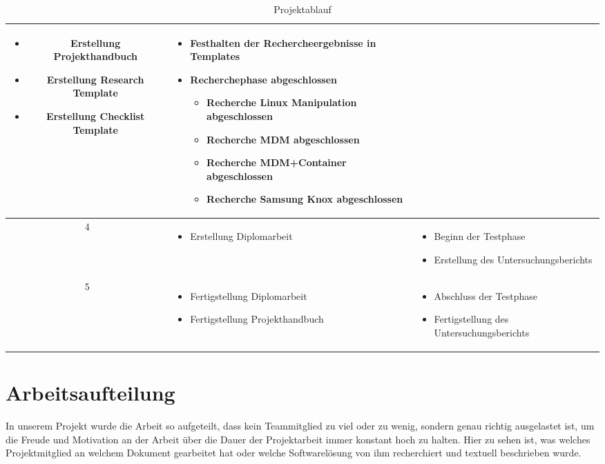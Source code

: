 \begin{table}
\begin{tabular}{| c | p{6.5cm} | p{7.5cm} |}
\begin{itemize}
			\item Erstellung Projekthandbuch
			\item Erstellung Research Template
			\item Erstellung Checklist Template
		\end{itemize}
		&%
		\begin{itemize}
			\item Festhalten der Rechercheergebnisse in Templates
			\item Recherchephase abgeschlossen
			\begin{itemize}
				\item Recherche Linux Manipulation abgeschlossen
				\item Recherche MDM abgeschlossen
				\item Recherche MDM+Container abgeschlossen
				\item Recherche Samsung Knox abgeschlossen
			\end{itemize}
		\end{itemize}
		\\\hline %
		4
		&%
		\begin{itemize}
			\item Erstellung Diplomarbeit
		\end{itemize}
		&%
		\begin{itemize}
			\item Beginn der Testphase
			\item Erstellung des Untersuchungsberichts
		\end{itemize}
		\\\hline %
		5
		&%
		\begin{itemize}
			\item Fertigstellung Diplomarbeit
			\item Fertigstellung Projekthandbuch
		\end{itemize}
		&%
		\begin{itemize}
			\item Abschluss der Testphase
			\item Fertigstellung des Untersuchungsberichts
		\end{itemize}
		\\\hline %
	\end{tabular}
	\caption{Projektablauf}
\end{table}

\newpage

\section{Arbeitsaufteilung}
In unserem Projekt wurde die Arbeit so aufgeteilt, dass kein Teammitglied zu viel oder zu wenig, sondern genau richtig ausgelastet ist, um die Freude und Motivation an der Arbeit über die Dauer der Projektarbeit immer konstant hoch zu halten. Hier zu sehen ist, was welches Projektmitglied an welchem Dokument gearbeitet hat oder welche Softwarelösung von ihm recherchiert und textuell beschrieben wurde.

